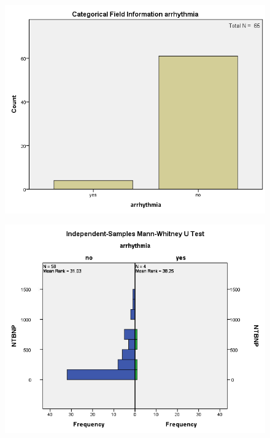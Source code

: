 \documentclass[14pt,a4paper,onecolumn]{extarticle}
\begin{document}
\clearpage
\begin{figure}
    \centering
    \includegraphics[scale=0.7]{../images/cat_arrhythmia.png}
    \small\caption{}
    \label{}
\end{figure}

\clearpage
\begin{figure}
    \centering
    \includegraphics[scale=0.7]{../images/manwhit_arrhythmia.png}
    \small\caption{}
    \label{}
\end{figure}
\end{document}
